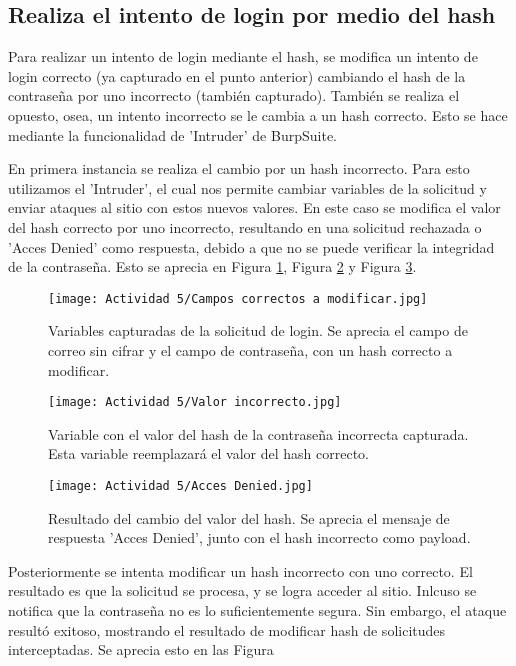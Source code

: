 \documentclass[letter,12pt]{article}
\begin{document}
\subsection{Realiza el intento de login por medio del hash}
Para realizar un intento de login mediante el hash, se modifica un intento de login correcto (ya capturado en el punto anterior) cambiando el hash de la contraseña por uno incorrecto (también capturado). También se realiza el opuesto, osea, un intento incorrecto se le cambia a un hash correcto. Esto se hace mediante la funcionalidad de 'Intruder' de BurpSuite.

En primera instancia se realiza el cambio por un hash incorrecto. Para esto utilizamos el 'Intruder', el cual nos permite cambiar variables de la solicitud y enviar ataques al sitio con estos nuevos valores. En este caso se modifica el valor del hash correcto por uno incorrecto, resultando en una solicitud rechazada o 'Acces Denied' como respuesta, debido a que no se puede verificar la integridad de la contraseña. Esto se aprecia en Figura \ref{fig:campos correctos}, Figura \ref{fig:valor incorrecto} y Figura \ref{fig:Acces Denied}.

\begin{figure}[H]
    \centering
    \texttt{[image: Actividad 5/Campos correctos a modificar.jpg]}
    \caption{Variables capturadas de la solicitud de login. Se aprecia el campo de correo sin cifrar y el campo de contraseña, con un hash correcto a modificar.}
    \label{fig:campos correctos}
\end{figure}

\begin{figure}[H]
    \centering
    \texttt{[image: Actividad 5/Valor incorrecto.jpg]}
    \caption{Variable con el valor del hash de la contraseña incorrecta capturada. Esta variable reemplazará el valor del hash correcto.}
    \label{fig:valor incorrecto}
\end{figure}

\begin{figure}[H]
    \centering
    \texttt{[image: Actividad 5/Acces Denied.jpg]}
    \caption{Resultado del cambio del valor del hash. Se aprecia el mensaje de respuesta 'Acces Denied', junto con el hash incorrecto como payload.}
    \label{fig:Acces Denied}
\end{figure}

Posteriormente se intenta modificar un hash incorrecto con uno correcto. El resultado es que la solicitud se procesa, y se logra acceder al sitio. Inlcuso se notifica que la contraseña no es lo suficientemente segura. Sin embargo, el ataque resultó exitoso, mostrando el resultado de modificar hash de solicitudes interceptadas. Se aprecia esto en las Figura 
\end{document}
